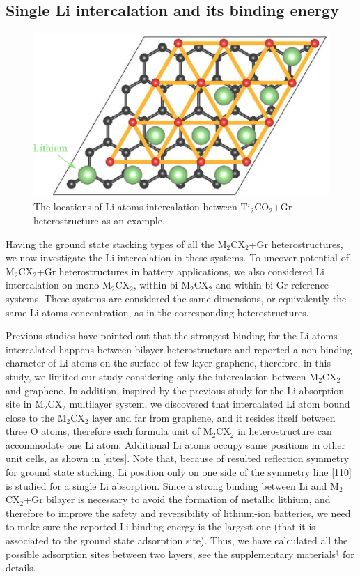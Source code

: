 \subsection{Single Li intercalation and its binding energy}

\begin{figure}[htb]
\centering
\includegraphics[width=0.8\linewidth]{sites.eps}%
\caption{The locations of Li atoms intercalation between Ti$_2$CO$_2$+Gr heterostructure as an example.  \label{sites}}
\end{figure}

Having the ground state stacking types of all the M$_2$CX$_2$+Gr heterostructures, we now investigate the Li intercalation in these systems. To uncover potential of M$_2$CX$_2$+Gr heterostructures in battery applications, we also considered Li intercalation on mono-M$_2$CX$_2$, within bi-M$_2$CX$_2$ and within bi-Gr reference systems. These systems are considered the same dimensions, or equivalently the same Li atoms concentration, as in the corresponding heterostructures.

Previous studies\cite{Guo2015,Samad2016,Lee2012} have pointed out that the strongest binding for the Li atoms intercalated happens between bilayer heterostructure and reported a non-binding character of Li atoms on the surface of few-layer graphene, therefore, in this study, we limited our study considering only the intercalation between M$_2$CX$_2$ and graphene. In addition, inspired by the previous study\cite{doi:10.1063/1.4939745} for the Li absorption site in M$_2$CX$_2$ multilayer system, we discovered that intercalated Li atom bound close to the M$_2$CX$_2$ layer and far from graphene, and it resides itself between three O atoms, therefore each formula unit of M$_2$CX$_2$ in heterostructure can accommodate one Li atom. Additional Li atoms occupy same positions in other unit cells, as shown in \autoref{sites}. Note that, because of resulted reflection symmetry for ground state stacking, Li position only on one side of the symmetry line [110] is studied for a single Li absorption.  Since a strong binding between Li and M$_2$CX$_2$+Gr bilayer is necessary to avoid the formation of metallic lithium, and therefore to improve the safety and reversibility of lithium-ion batteries, we need to make sure the reported Li binding energy is the largest one (that it is associated to the ground state adsorption site). Thus, we have calculated all the possible adsorption sites between two layers, see the supplementary materials$^\dag$ for details. 

